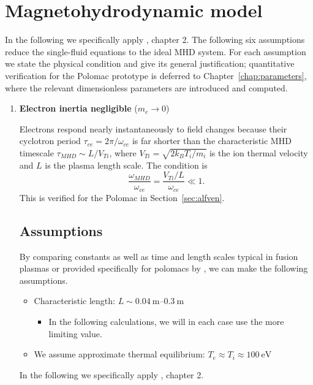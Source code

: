 \section{Magnetohydrodynamic model}
\label{subsec:mhd_assumptions}
In the following we specifically apply \cite{Freidberg2014}, chapter 2.
The following six assumptions reduce the single-fluid equations to the
ideal MHD system.  For each assumption we state the physical condition
and give its general justification; quantitative verification for the
Polomac prototype is deferred to Chapter~\ref{chap:parameters}, where
the relevant dimensionless parameters are introduced and computed.

\begin{enumerate}

\item \textbf{Electron inertia negligible} ($m_e \to 0$)

Electrons respond nearly instantaneously to field changes because their
cyclotron period $\tau_{ce}=2\pi/\omega_{ce}$ is far shorter than the
characteristic MHD timescale $\tau_{MHD}\sim L/V_{Ti}$, where
$V_{Ti}=\sqrt{2k_BT_i/m_i}$ is the ion thermal velocity and $L$ is the
plasma length scale.  The condition is
\[
    \frac{\omega_{MHD}}{\omega_{ce}}
    = \frac{V_{Ti}/L}{\omega_{ce}} \ll 1.
\]
This is verified for the Polomac in Section~\ref{sec:alfven}.

\subsection{Assumptions}

By comparing constants as well as time and length scales typical in fusion plasmas or provided specifically for polomacs by \cite{Elio2024}, we can make the following assumptions.

\begin{itemize}
    \item Characteristic length: $L \sim \SIrange{0.04}{0.3}{\meter}$
    \begin{itemize}
        \item In the following calculations, we will in each case use the more limiting value.
    \end{itemize}
    \item We assume approximate thermal equilibrium: $T_e \approx T_i \approx \SI{100}{\electronvolt}$
\end{itemize}

In the following we specifically apply  \cite{Freidberg2014}, chapter 2.


\end{enumerate}
